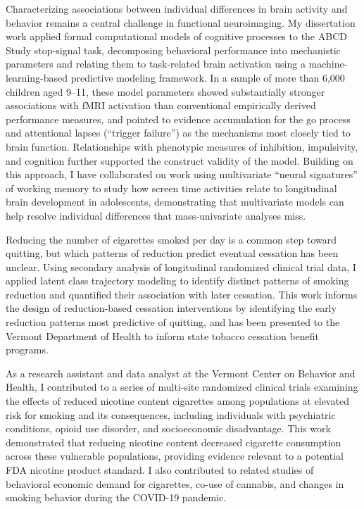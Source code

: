 \documentclass{nihbiosketch}
\begin{document}
\begin{contributions}
	Characterizing associations between individual differences in brain activity and behavior remains a central challenge in functional neuroimaging. My dissertation work applied formal computational models of cognitive processes to the ABCD Study stop-signal task, decomposing behavioral performance into mechanistic parameters and relating them to task-related brain activation using a machine-learning-based predictive modeling framework. In a sample of more than 6,000 children aged 9--11, these model parameters showed substantially stronger associations with fMRI activation than conventional empirically derived performance measures, and pointed to evidence accumulation for the go process and attentional lapses (``trigger failure'') as the mechanisms most closely tied to brain function. Relationships with phenotypic measures of inhibition, impulsivity, and cognition further supported the construct validity of the model. Building on this approach, I have collaborated on work using multivariate ``neural signatures'' of working memory to study how screen time activities relate to longitudinal brain development in adolescents, demonstrating that multivariate models can help resolve individual differences that mass-univariate analyses miss.

	Reducing the number of cigarettes smoked per day is a common step toward quitting, but which patterns of reduction predict eventual cessation has been unclear. Using secondary analysis of longitudinal randomized clinical trial data, I applied latent class trajectory modeling to identify distinct patterns of smoking reduction and quantified their association with later cessation. This work informs the design of reduction-based cessation interventions by identifying the early reduction patterns most predictive of quitting, and has been presented to the Vermont Department of Health to inform state tobacco cessation benefit programs.

	As a research assistant and data analyst at the Vermont Center on Behavior and Health, I contributed to a series of multi-site randomized clinical trials examining the effects of reduced nicotine content cigarettes among populations at elevated risk for smoking and its consequences, including individuals with psychiatric conditions, opioid use disorder, and socioeconomic disadvantage. This work demonstrated that reducing nicotine content decreased cigarette consumption across these vulnerable populations, providing evidence relevant to a potential FDA nicotine product standard. I also contributed to related studies of behavioral economic demand for cigarettes, co-use of cannabis, and changes in smoking behavior during the COVID-19 pandemic.
\end{contributions}

\certification
\end{document}
